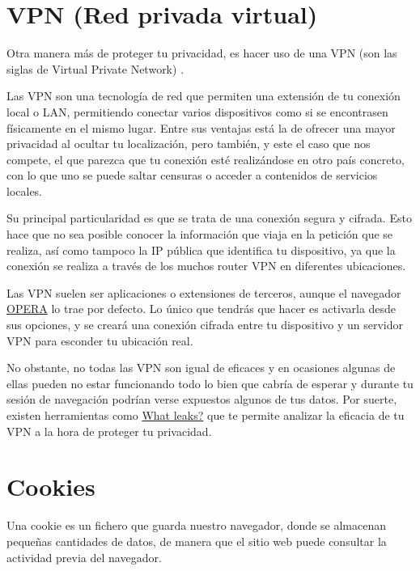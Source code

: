 \documentclass[
  spanish,
  a4paper,
  openany]{book}
\begin{document}
\hypertarget{vpn-red-privada-virtual}{%
\section{VPN (Red privada virtual)}\label{vpn-red-privada-virtual}}

Otra manera más de proteger tu privacidad, es hacer uso de una VPN (son las siglas de Virtual Private Network) \citep{AVAST-vpn}.

Las VPN son una tecnología de red que permiten una extensión de tu conexión local o LAN, permitiendo conectar varios dispositivos como si se encontrasen físicamente en el mismo lugar. Entre sus ventajas está la de ofrecer una mayor privacidad al ocultar tu localización, pero también, y este el caso que nos compete, el que parezca que tu conexión esté realizándose en otro país concreto, con lo que uno se puede saltar censuras o acceder a contenidos de servicios locales.

Su principal particularidad es que se trata de una conexión segura y cifrada. Esto hace que no sea posible conocer la información que viaja en la petición que se realiza, así como tampoco la IP pública que identifica tu dispositivo, ya que la conexión se realiza a través de los muchos router VPN en diferentes ubicaciones.

Las VPN suelen ser aplicaciones o extensiones de terceros, aunque el navegador \href{https://www.opera.com/es}{OPERA} lo trae por defecto. Lo único que tendrás que hacer es activarla desde sus opciones, y se creará una conexión cifrada entre tu dispositivo y un servidor VPN para esconder tu ubicación real.

No obstante, no todas las VPN son igual de eficaces y en ocasiones algunas de ellas pueden no estar funcionando todo lo bien que cabría de esperar y durante tu sesión de navegación podrían verse expuestos algunos de tus datos. Por suerte, existen herramientas como \href{https://whatleaks.com/}{What leaks?} que te permite analizar la eficacia de tu VPN a la hora de proteger tu privacidad.

\hypertarget{cookies}{%
\section{Cookies}\label{cookies}}

Una cookie es un fichero que guarda nuestro navegador, donde se almacenan pequeñas cantidades de datos, de manera que el sitio web puede consultar la actividad previa del navegador.
\end{document}
